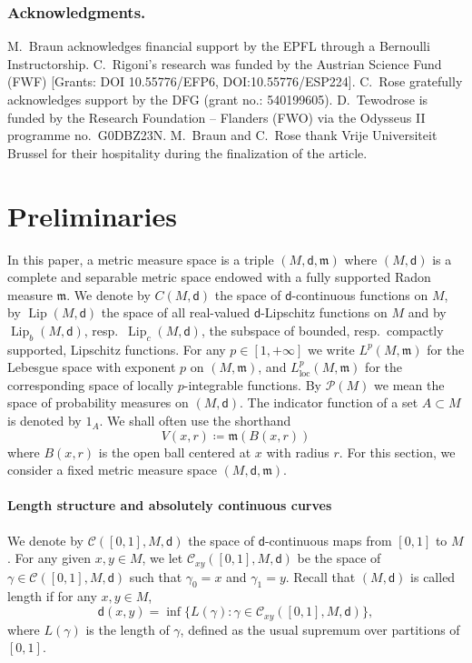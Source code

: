 \documentclass[10pt]{article}
\newcommand{\cC}{\mathcal{C}}
\newcommand{\m}{\mathfrak{m}}
\newcommand{\One}{1}
\newcommand{\dist}{\mathsf{d}}
\newcommand{\df}{\coloneqq}
\DeclareMathOperator{\Lip}{Lip}
\theoremstyle{plain}
\theoremstyle{definition}
\newcommand{\contpath}{\cC([0,1],M,\dist)}
\newcommand{\contpathxy}{\cC_{xy}([0,1],M,\dist)}
\begin{document}
\subsubsection*{Acknowledgments.} M.~Braun acknowledges financial support by the EPFL through a Bernoulli Instructorship. C.~Rigoni's research was funded by the Austrian Science Fund (FWF) [Grants: DOI 10.55776/EFP6, DOI:10.55776/ESP224]. C.~Rose gratefully acknowledges support by the DFG (grant no.: 540199605). D.~Tewodrose is funded by the Research Foundation – Flanders (FWO) via the Odysseus II programme no.~G0DBZ23N. M.~Braun and C.~Rose thank Vrije Universiteit Brussel for their hospitality during the finalization of the article. 

\section{Preliminaries}

In this paper, a metric measure space is a triple $(M,\dist,\m)$ where $(M,\dist)$ is a complete and separable metric space endowed with a fully supported Radon measure $\m$. We denote by $C(M,\dist)$ the space of $\dist$-continuous functions on $M$, by $\Lip(M,\dist)$ the space of all real-valued $\dist$-Lipschitz functions on $M$ and by
$\Lip_b(M,\dist)$,  resp.~$\Lip_c(M,\dist)$, the subspace of bounded, resp.~compactly supported, Lipschitz functions. For any $p \in [1,+\infty]$ we write $L^p(M,\m)$ for the Lebesgue space with exponent $p$ on $(M,\m)$, and $L^p_{\text{loc}}(M,\m)$ for the corresponding space of locally $p$-integrable functions. By $\mathcal{P}(M)$ we mean the space of probability measures on $(M,\dist)$. The indicator function of a set $A \subset M$ is denoted by $\One_A$. We shall often use the shorthand
\[
V(x,r) \df \m(B(x,r))
\]
where $B(x,r)$ is the open ball centered at $x$ with radius $r$. For this section, we consider a fixed metric measure space $(M,\dist,\m)$.\\


\paragraph{Length structure and absolutely continuous curves} We denote by $\contpath$ the space of $\dist$-continuous maps from $[0,1]$ to $M$. For any given $x,y \in M$, we let $\contpathxy$ be the space of  $\gamma \in \contpath$ such that $\gamma_0=x$ and $\gamma_1=y$. Recall that $(M,\dist)$ is called length if for any $x,y \in M$,
\[
\dist(x,y) = \inf \{ L(\gamma) : \gamma  \in \contpathxy \},
\]
where $L(\gamma)$ is the length of $\gamma$, defined as the usual supremum over partitions of $[0,1]$.
\end{document}

